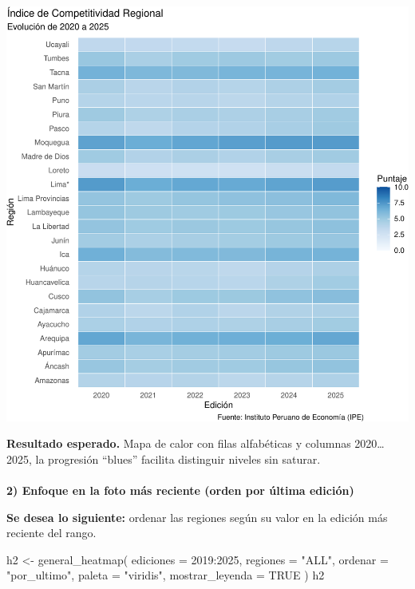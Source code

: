 \documentclass[
  11pt,
  letterpaper,
  DIV=11,
  numbers=noendperiod]{scrartcl}
\makeatletter
\let\oldparagraph\paragraph
\renewcommand{\paragraph}{
    \@ifstar
      \xxxParagraphStar
      \xxxParagraphNoStar
  }
\newcommand{\xxxParagraphStar}[1]{\oldparagraph*{#1}\mbox{}}
\newcommand{\xxxParagraphNoStar}[1]{\oldparagraph{#1}\mbox{}}
\newenvironment{Shaded}{\begin{snugshade}}{\end{snugshade}}
\newcommand{\AttributeTok}[1]{\textcolor[rgb]{0.40,0.45,0.13}{#1}}
\newcommand{\ConstantTok}[1]{\textcolor[rgb]{0.56,0.35,0.01}{#1}}
\newcommand{\DecValTok}[1]{\textcolor[rgb]{0.68,0.00,0.00}{#1}}
\newcommand{\FunctionTok}[1]{\textcolor[rgb]{0.28,0.35,0.67}{#1}}
\newcommand{\NormalTok}[1]{\textcolor[rgb]{0.00,0.23,0.31}{#1}}
\newcommand{\OtherTok}[1]{\textcolor[rgb]{0.00,0.23,0.31}{#1}}
\newcommand{\SpecialCharTok}[1]{\textcolor[rgb]{0.37,0.37,0.37}{#1}}
\newcommand{\StringTok}[1]{\textcolor[rgb]{0.13,0.47,0.30}{#1}}
\makeatother
\begin{document}
\includegraphics{Manual_files/figure-pdf/unnamed-chunk-31-1.pdf}

\textbf{Resultado esperado.} Mapa de calor con filas alfabéticas y
columnas 2020\ldots2025, la progresión ``blues'' facilita distinguir
niveles sin saturar.

\paragraph{\texorpdfstring{\textbf{2) Enfoque en la foto más reciente
(orden por última
edición)}}{2) Enfoque en la foto más reciente (orden por última edición)}}\label{enfoque-en-la-foto-muxe1s-reciente-orden-por-uxfaltima-ediciuxf3n}

\textbf{Se desea lo siguiente:} ordenar las regiones según su valor en
la edición más reciente del rango.

\begin{Shaded}
\begin{Highlighting}[]
\NormalTok{h2 }\OtherTok{\textless{}{-}} \FunctionTok{general\_heatmap}\NormalTok{(}
  \AttributeTok{ediciones =} \DecValTok{2019}\SpecialCharTok{:}\DecValTok{2025}\NormalTok{,}
  \AttributeTok{regiones  =} \StringTok{"ALL"}\NormalTok{,}
  \AttributeTok{ordenar   =} \StringTok{"por\_ultimo"}\NormalTok{,}
  \AttributeTok{paleta    =} \StringTok{"viridis"}\NormalTok{,}
  \AttributeTok{mostrar\_leyenda =} \ConstantTok{TRUE}
\NormalTok{)}
\NormalTok{h2}
\end{Highlighting}
\end{Shaded}
\end{document}
